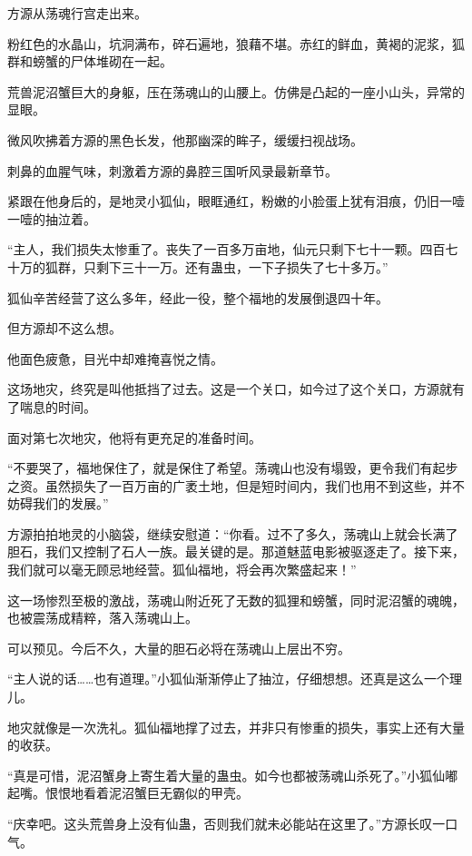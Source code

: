 
\begin{this_body}

方源从荡魂行宫走出来。

粉红色的水晶山，坑洞满布，碎石遍地，狼藉不堪。赤红的鲜血，黄褐的泥浆，狐群和螃蟹的尸体堆砌在一起。

荒兽泥沼蟹巨大的身躯，压在荡魂山的山腰上。仿佛是凸起的一座小山头，异常的显眼。

微风吹拂着方源的黑色长发，他那幽深的眸子，缓缓扫视战场。

刺鼻的血腥气味，刺激着方源的鼻腔三国听风录最新章节。

紧跟在他身后的，是地灵小狐仙，眼眶通红，粉嫩的小脸蛋上犹有泪痕，仍旧一噎一噎的抽泣着。

“主人，我们损失太惨重了。丧失了一百多万亩地，仙元只剩下七十一颗。四百七十万的狐群，只剩下三十一万。还有蛊虫，一下子损失了七十多万。”

狐仙辛苦经营了这么多年，经此一役，整个福地的发展倒退四十年。

但方源却不这么想。

他面色疲惫，目光中却难掩喜悦之情。

这场地灾，终究是叫他抵挡了过去。这是一个关口，如今过了这个关口，方源就有了喘息的时间。

面对第七次地灾，他将有更充足的准备时间。

“不要哭了，福地保住了，就是保住了希望。荡魂山也没有塌毁，更令我们有起步之资。虽然损失了一百万亩的广袤土地，但是短时间内，我们也用不到这些，并不妨碍我们的发展。”

方源拍拍地灵的小脑袋，继续安慰道：“你看。过不了多久，荡魂山上就会长满了胆石，我们又控制了石人一族。最关键的是。那道魅蓝电影被驱逐走了。接下来，我们就可以毫无顾忌地经营。狐仙福地，将会再次繁盛起来！”

这一场惨烈至极的激战，荡魂山附近死了无数的狐狸和螃蟹，同时泥沼蟹的魂魄，也被震荡成精粹，落入荡魂山上。

可以预见。今后不久，大量的胆石必将在荡魂山上层出不穷。

“主人说的话……也有道理。”小狐仙渐渐停止了抽泣，仔细想想。还真是这么一个理儿。

地灾就像是一次洗礼。狐仙福地撑了过去，并非只有惨重的损失，事实上还有大量的收获。

“真是可惜，泥沼蟹身上寄生着大量的蛊虫。如今也都被荡魂山杀死了。”小狐仙嘟起嘴。恨恨地看着泥沼蟹巨无霸似的甲壳。

“庆幸吧。这头荒兽身上没有仙蛊，否则我们就未必能站在这里了。”方源长叹一口气。


\end{this_body}
